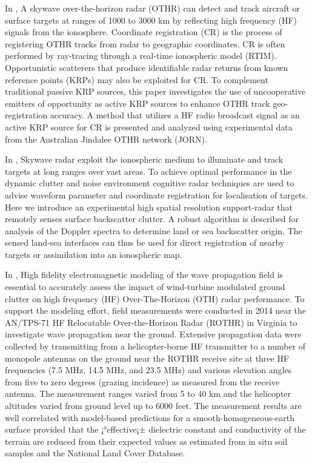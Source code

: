 In \cite{fabrizio2016using}, A skywave over-the-horizon radar (OTHR) can detect and track aircraft or surface targets at ranges of 1000 to 3000 km by reflecting high frequency (HF) signals from the ionosphere. Coordinate registration (CR) is the process of registering OTHR tracks from radar to geographic coordinates. CR is often performed by ray-tracing through a real-time ionospheric model (RTIM). Opportunistic scatterers that produce identifiable radar returns from known reference points (KRPs) may also be exploited for CR. To complement traditional passive KRP sources, this paper investigates the use of uncooperative emitters of opportunity as active KRP sources to enhance OTHR track geo-registration accuracy. A method that utilizes a HF radio broadcast signal as an active KRP source for CR is presented and analyzed using experimental data from the Australian Jindalee OTHR network (JORN).


In \cite{turley2013high}, Skywave radar exploit the ionospheric medium to illuminate and track targets at long ranges over vast areas. To achieve optimal performance in the dynamic clutter and noise environment cognitive radar techniques are used to advise waveform parameter and coordinate registration for localisation of targets. Here we introduce an experimental high spatial resolution support-radar that remotely senses surface backscatter clutter. A robust algorithm is described for analysis of the Doppler spectra to determine land or sea backscatter origin. The sensed land-sea interfaces can thus be used for direct registration of nearby targets or assimilation into an ionospheric map.

In \cite{coutts2015low}, High fidelity electromagnetic modeling of the wave propagation field is essential to accurately assess the impact of wind-turbine modulated ground clutter on high frequency (HF) Over-The-Horizon (OTH) radar performance. To support the modeling effort, field measurements were conducted in 2014 near the AN/TPS-71 HF Relocatable Over-the-Horizon Radar (ROTHR) in Virginia to investigate wave propagation near the ground. Extensive propagation data were collected by transmitting from a helicopter-borne HF transmitter to a number of monopole antennas on the ground near the ROTHR receive site at three HF frequencies (7.5 MHz, 14.5 MHz, and 23.5 MHz) and various elevation angles from five to zero degrees (grazing incidence) as measured from the receive antenna. The measurement ranges varied from 5 to 40 km and the helicopter altitudes varied from ground level up to 6000 feet. The measurement results are well correlated with model-based predictions for a smooth-homogeneous-earth surface provided that the ¡°effective¡± dielectric constant and conductivity of the terrain are reduced from their expected values as estimated from in situ soil samples and the National Land Cover Database.


